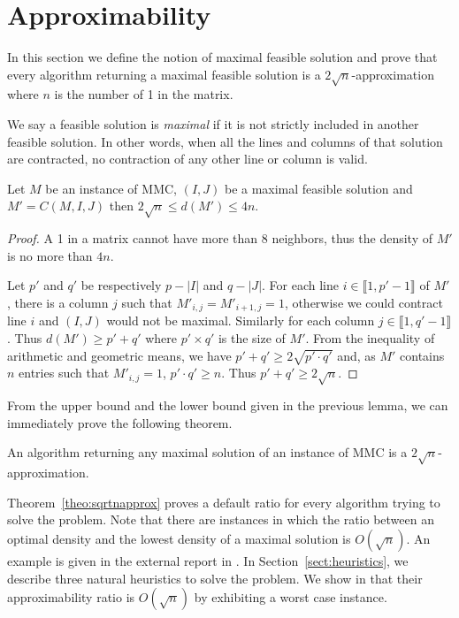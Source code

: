 \section{Approximability}
\label{sect:approx}

In this section we define the notion of maximal feasible solution and prove that every algorithm returning a maximal feasible solution is a $2\sqrt{n}$-approximation where $n$ is the number of 1 in the matrix.

\begin{definition}
We say a feasible solution is \emph{maximal} if it is not strictly included in another feasible solution. In other words, when all the lines and columns of that solution are contracted, no contraction of any other line or column is valid.
\end{definition}

\begin{lemma}
\label{lem:bounds}
Let $M$ be an instance of MMC, $(I,J)$ be a maximal feasible solution and $M' = C(M,I,J)$ then $2 \sqrt{n} \leq d(M') \leq 4n$.
\end{lemma}
\begin{proof}
A 1 in a matrix cannot have more than $8$ neighbors, thus the density of $M'$ is no more than $4n$.

Let $p'$ and $q'$ be respectively $p - |I|$ and $q - |J|$. For each line $i \in \llbracket 1,p'-1 \rrbracket$ of $M'$, there is a column $j$ such that $M'_{i,j} = M'_{i+1,j} = 1$, otherwise we could contract line $i$ and $(I,J)$ would not be maximal. Similarly for each column $j \in \llbracket 1,q'-1 \rrbracket$. Thus $d(M') \geq p'+q'$ where $p' \times q'$ is the size of $M'$. From the inequality of arithmetic and geometric means, we have $p' + q ' \geq 2 \sqrt{p'\cdot q'}$ and, as $M'$ contains $n$ entries such that $M'_{i,j} = 1$, $p'\cdot q' \geq n$. Thus $p' + q ' \geq 2 \sqrt{n}$.
\end{proof}

From the upper bound and the lower bound given in the previous lemma, we can immediately prove the following theorem. 

\begin{theorem}
	\label{theo:sqrtnapprox}
An algorithm returning any maximal solution of an instance of MMC is a $2\sqrt{n}$-approximation.
\end{theorem}

Theorem~\ref{theo:sqrtnapprox} proves a default ratio for every algorithm trying to solve the problem. Note that there are instances in which the ratio between an optimal density and the lowest density of a maximal solution is $O(\sqrt{n})$. An example is given in the external report in \cite{WatelPoirionAppendix}. In Section~\ref{sect:heuristics}, we describe three natural heuristics to solve the problem. We show in \cite{WatelPoirionAppendix} that their approximability ratio is $O(\sqrt{n})$ by exhibiting a worst case instance.

